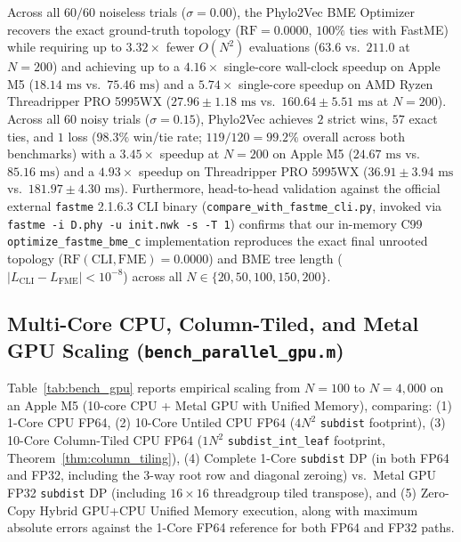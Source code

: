 \documentclass[11pt,a4paper]{article}
\theoremstyle{definition}
\begin{document}
Across all $60 / 60$ noiseless trials ($\sigma = 0.00$), the Phylo2Vec BME Optimizer recovers the exact ground-truth topology ($\text{RF} = 0.0000$, $100\%$ ties with FastME) while requiring up to $\mathbf{3.32\times}$ fewer $O(N^2)$ evaluations ($63.6$ vs.\ $211.0$ at $N=200$) and achieving up to a $\mathbf{4.16\times}$ single-core wall-clock speedup on Apple M5 ($18.14\text{ ms}$ vs.\ $75.46\text{ ms}$) and a $\mathbf{5.74\times}$ single-core speedup on AMD Ryzen Threadripper PRO 5995WX ($27.96 \pm 1.18\text{ ms}$ vs.\ $160.64 \pm 5.51\text{ ms}$ at $N=200$). Across all $60$ noisy trials ($\sigma = 0.15$), Phylo2Vec achieves $2$ strict wins, $57$ exact ties, and $1$ loss ($98.3\%$ win/tie rate; $119 / 120 = 99.2\%$ overall across both benchmarks) with a $\mathbf{3.45\times}$ speedup at $N=200$ on Apple M5 ($24.67\text{ ms}$ vs.\ $85.16\text{ ms}$) and a $\mathbf{4.93\times}$ speedup on Threadripper PRO 5995WX ($36.91 \pm 3.94\text{ ms}$ vs.\ $181.97 \pm 4.30\text{ ms}$). Furthermore, head-to-head validation against the official external \texttt{fastme} 2.1.6.3 CLI binary (\texttt{compare\_with\_fastme\_cli.py}, invoked via \texttt{fastme -i D.phy -u init.nwk -s -T 1}) confirms that our in-memory C99 \texttt{optimize\_fastme\_bme\_c} implementation reproduces the exact final unrooted topology ($\text{RF}(\text{CLI}, \text{FME}) = 0.0000$) and BME tree length ($|L_{\text{CLI}} - L_{\text{FME}}| < 10^{-8}$) across all $N \in \{20, 50, 100, 150, 200\}$.

\subsection{Multi-Core CPU, Column-Tiled, and Metal GPU Scaling (\texttt{bench\_parallel\_gpu.m})}
Table~\ref{tab:bench_gpu} reports empirical scaling from $N = 100$ to $N = 4{,}000$ on an Apple M5 (10-core CPU + Metal GPU with Unified Memory), comparing: (1) 1-Core CPU FP64, (2) 10-Core Untiled CPU FP64 ($4N^2$ \texttt{subdist} footprint), (3) 10-Core Column-Tiled CPU FP64 ($1N^2$ \texttt{subdist\_int\_leaf} footprint, Theorem~\ref{thm:column_tiling}), (4) Complete 1-Core \texttt{subdist} DP (in both FP64 and FP32, including the 3-way root row and diagonal zeroing) vs.\ Metal GPU FP32 \texttt{subdist} DP (including $16 \times 16$ threadgroup tiled transpose), and (5) Zero-Copy Hybrid GPU+CPU Unified Memory execution, along with maximum absolute errors against the 1-Core FP64 reference for both FP64 and FP32 paths.
\end{document}
